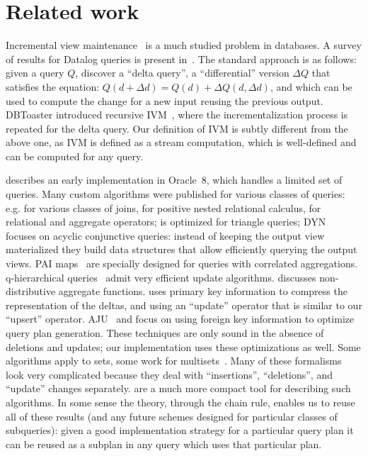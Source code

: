 \section{Related work}\label{sec:related}

Incremental view
maintenance~\cite{buneman-actd79,blakeley-sigmod86,gupta-sigmod93,chaudhuri-icde95,gupta-idb95,chirkova-book12}
is a much studied problem in databases.  A survey of results for
Datalog queries is present in~\cite{motik-ai19}.  The standard
approach is as follows: given a query $Q$, discover a ``delta query'',
a ``differential'' version $\Delta Q$ that satisfies the equation:
$Q(d+\Delta d)=Q(d)+\Delta Q(d,\Delta d)$, and which can be used to
compute the change for a new input reusing the previous output.
DBToaster introduced recursive
IVM~\cite{ahmad-vldb09,koch-pods10,nikolic-sigmod16}, where the
incrementalization process is repeated for the delta query.  Our
definition of IVM is subtly different from the above one, as IVM is
defined as a stream computation, which is well-defined and can be
computed for any query.

\cite{bello-vldb98} describes an early implementation in Oracle~8,
which handles a limited set of queries.  Many custom algorithms were
published for various classes of queries:
e.g. \cite{griffin-sigmod98,larson-icde07} for various classes of
joins, \cite{koch-pods16} for positive nested relational calculus,
\cite{gupta-infsys06} for relational and aggregate operators;
\cite{kara-tds20} is optimized for triangle queries;
DYN~\cite{idris-sigmod17,idris-vldb18,idris-sigmod19} focuses on
acyclic conjunctive queries: instead of keeping the output view
materialized they build data structures that allow efficiently
querying the output views.  PAI maps~\cite{abeysinghe-sigmod22} are
specially designed for queries with correlated aggregations.
q-hierarchical que\-ries~\cite{berkholz-pods17} admit very efficient
update algorithms.  \cite{palpanas-vldb02} discusses non-distributive
aggregate functions.  \cite{katsis-sigmod15} uses primary key
information to compress the representation of the deltas, and using an
``update'' operator that is similar to our ``upsert'' operator.
AJU~\cite{wang-sigmod20} and \cite{svingos-amd23} focus on using
foreign key information to optimize query plan generation.  These
techniques are only sound in the absence of deletions and updates; our
implementation uses these optimizations as well.  Some algorithms
apply to sets, some work for multisets~\cite{griffin-sigmod95}.  Many
of these formalisms look very complicated because they deal with
``insertions'', ``deletions'', and ``update'' changes separately.
\zrs are a much more compact tool for describing such algorithms.  In
some sense the \dbsp theory, through the chain rule, enables us to
reuse all of these results (and any future schemes designed for
particular classes of subqueries): given a good implementation
strategy for a particular query plan it can be reused as a subplan in
any query which uses that particular plan.


